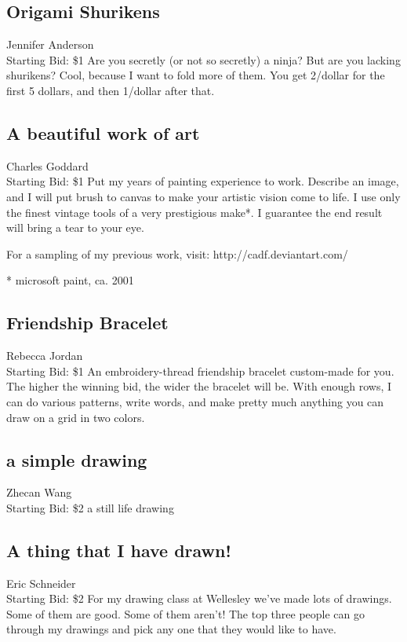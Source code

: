 \documentclass[11pt]{article}
\begin{document}
\subsection{Origami Shurikens}
Jennifer Anderson
\\
Starting Bid: \$1
\newline
Are you secretly (or not so secretly) a ninja? But are you lacking shurikens? Cool, because I want to fold more of them.
You get 2/dollar for the first 5 dollars, and then 1/dollar after that.
\subsection{A beautiful work of art}
Charles Goddard
\\
Starting Bid: \$1
\newline
Put my years of painting experience to work. Describe an image, and I will put brush to canvas to make your artistic vision come to life. I use only the finest vintage tools of a very prestigious make*. I guarantee the end result will bring a tear to your eye.

For a sampling of my previous work, visit:
http://cadf.deviantart.com/

* microsoft paint, ca. 2001
\subsection{Friendship Bracelet}
Rebecca Jordan
\\
Starting Bid: \$1
\newline
An embroidery-thread friendship bracelet custom-made for you. The higher the winning bid, the wider the bracelet will be. With enough rows, I can do various patterns, write words, and make pretty much anything you can draw on a grid in two colors.
\subsection{a simple drawing}
Zhecan Wang
\\
Starting Bid: \$2
\newline
a still life drawing
\subsection{A thing that I have drawn!}
Eric Schneider
\\
Starting Bid: \$2
\newline
For my drawing class at Wellesley we've made lots of drawings. Some of them are good. Some of them aren't! The top three people can go through my drawings and pick any one that they would like to have.
\end{document}

